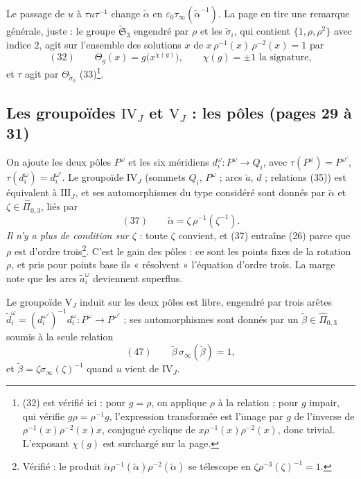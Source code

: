 \documentclass[11pt,a4paper]{article}
\begin{document}
Le passage de $u$ à $\tau u \tau^{-1}$ change $\tilde\alpha$ en
$\varepsilon_0\tau_\infty(\tilde\alpha^{-1})$. La page en tire une remarque
générale, juste : le groupe $\widetilde{\mathfrak{S}}_3$ engendré par $\rho$
et les $\tilde\sigma_i$, qui contient $\{1, \rho, \rho^2\}$ avec indice $2$,
agit sur l'ensemble des solutions $x$ de $x\,\rho^{-1}(x)\,\rho^{-2}(x) = 1$
par
\[
(32)\qquad \Theta_g(x) = g\bigl(x^{\chi(g)}\bigr), \qquad \chi(g) = \pm 1 \text{ la signature},
\]
et $\tau$ agit par $\Theta_{\tilde\sigma_0}$ (33)\footnote{(32) est vérifié
ici : pour $g = \rho$, on applique $\rho$ à la relation ; pour $g$ impair, qui
vérifie $g\rho = \rho^{-1}g$, l'expression transformée est l'image par $g$ de
l'inverse de $\rho^{-1}(x)\rho^{-2}(x)x$, conjugué cyclique de
$x\rho^{-1}(x)\rho^{-2}(x)$, donc trivial. L'exposant $\chi(g)$ est surchargé
sur la page.}.

\subsection*{Les groupoïdes $\mathrm{IV}_J$ et $\mathrm{V}_J$ : les pôles (pages 29 à 31)}

On ajoute les deux pôles $P^{\omega}$ et les six méridiens $d_i^{\omega} :
P^{\omega} \to Q_i$, avec $\tau(P^{\omega}) = P^{\omega'}$,
$\tau(d_i^{\omega}) = d_i^{\omega'}$. Le groupoïde $\mathrm{IV}_J$ (sommets
$Q_i$, $P^{\omega}$ ; arcs $\tilde a$, $d$ ; relations (35)) est équivalent à
$\mathrm{III}_J$, et ses automorphismes du type considéré sont donnés par
$\tilde\alpha$ et $\zeta \in \widehat\Pi_{0,3}$, liés par
\[
(37)\qquad \tilde\alpha = \zeta\, \rho^{-1}(\zeta^{-1}) .
\]
\emph{Il n'y a plus de condition sur $\zeta$} : toute $\zeta$ convient, et
(37) entraîne (26) parce que $\rho$ est d'ordre trois\footnote{Vérifié : le produit
$\tilde\alpha\rho^{-1}(\tilde\alpha)\rho^{-2}(\tilde\alpha)$ se télescope en
$\zeta\rho^{-3}(\zeta)^{-1} = 1$.}. C'est le gain des pôles : ce sont les
points fixes de la rotation $\rho$, et pris pour points base ils
« résolvent » l'équation d'ordre trois. La marge note que les arcs $\tilde
a_i^{\omega}$ deviennent superflus.

Le groupoïde $\mathrm{V}_J$ induit sur les deux pôles est libre, engendré par
trois arêtes $\tilde d_i^{\omega} = (d_i^{\omega'})^{-1} d_i^{\omega} :
P^{\omega} \to P^{\omega'}$ ; ses automorphismes sont donnés par un
$\tilde\beta \in \widehat\Pi_{0,3}$ soumis à la seule relation
\[
(47)\qquad \tilde\beta\, \sigma_\infty(\tilde\beta) = 1 ,
\]
et $\tilde\beta = \zeta\sigma_\infty(\zeta)^{-1}$ quand $u$ vient de
$\mathrm{IV}_J$.
\end{document}
